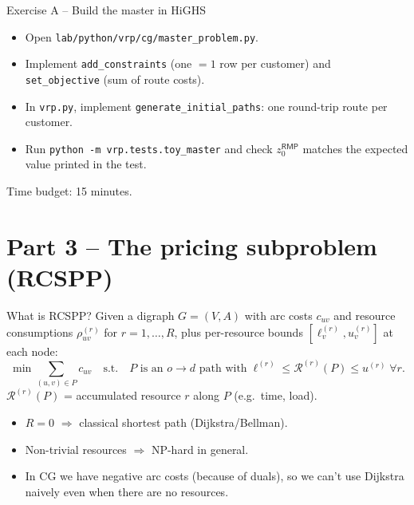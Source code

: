 \documentclass[10pt,aspectratio=169]{beamer}
\newcommand{\rmp}{\mathsf{RMP}}
\begin{document}
\begin{frame}{Exercise A -- Build the master in HiGHS}
  \begin{exbox}
    \begin{itemize}\small
      \item Open \texttt{lab/python/vrp/cg/master\_problem.py}.
      \item Implement \texttt{add\_constraints} (one $=\!1$ row per customer)
            and \texttt{set\_objective} (sum of route costs).
      \item In \texttt{vrp.py}, implement \texttt{generate\_initial\_paths}:
            one round-trip route per customer.
      \item Run \texttt{python -m vrp.tests.toy\_master} and check
            $z^{\rmp}_0$ matches the expected value printed in the test.
    \end{itemize}
    \alert{Time budget: 15 minutes.}
  \end{exbox}
\end{frame}

\section{Part 3 -- The pricing subproblem (RCSPP)}

\begin{frame}{What is RCSPP?}
  Given a digraph $G=(V,A)$ with arc costs $c_{uv}$ and \alert{resource}
  consumptions $\rho_{uv}^{(r)}$ for $r=1,\dots,R$, plus per-resource bounds
  $[\ell_v^{(r)},u_v^{(r)}]$ at each node:
  \[
     \min \sum_{(u,v)\in P} c_{uv} \quad
     \text{s.t.}\quad P\text{ is an } o\!\to\!d \text{ path with}\;
     \ell^{(r)}\le \mathcal R^{(r)}(P) \le u^{(r)}\;\forall r.
  \]
  $\mathcal R^{(r)}(P)$ = accumulated resource $r$ along $P$ (e.g.\ time, load).

  \medskip
  \begin{itemize}\small
    \item $R\!=\!0$ $\Rightarrow$ classical shortest path (Dijkstra/Bellman).
    \item Non-trivial resources $\Rightarrow$ NP-hard in general.
    \item In CG we have negative arc costs (because of duals), so we can't
          use Dijkstra naively even when there are no resources.
  \end{itemize}
\end{frame}
\end{document}
